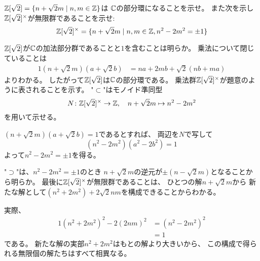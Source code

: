 \documentclass[report]{jlreq}
\begin{document}
\begin{problem}[代数学II 1.18]
    $\mathbb{Z}[\sqrt{2}] = \{ n + \sqrt{2}m \mid n, m \in \mathbb{Z} \}$は
    $\mathbb{C}$の部分環になることを示せ。
    また次を示し$\mathbb{Z}[\sqrt{2}]^\times$が無限群であることを示せ:
    \begin{equation}
        \mathbb{Z}[\sqrt{2}]^\times
            = \{ n + \sqrt{2}m \mid n, m \in \mathbb{Z}, n^2 - 2m^2 = \pm 1 \}
    \end{equation}
\end{problem}

\begin{answer}
    $\mathbb{Z}[\sqrt{2}]$が$\mathbb{C}$の加法部分群であることと$1$を含むことは明らか。
    乗法について閉じていることは
    \begin{alignat}{1}
        (n + \sqrt{2} m) (a + \sqrt{2} b)
            &= na + 2mb + \sqrt{2} (nb + ma)
    \end{alignat}
    よりわかる。
    したがって$\mathbb{Z}[\sqrt{2}]$は$\mathbb{C}$の部分環である。
    乗法群$\mathbb{Z}[\sqrt{2}]^\times$が題意のように表されることを示す。
    "$\subset$"はモノイド準同型
    \begin{equation}
        N \colon \mathbb{Z}[\sqrt{2}]^\times \to \mathbb{Z},
        \quad n + \sqrt{2} m \mapsto n^2 - 2m^2
    \end{equation}
    を用いて示せる。
    \begin{innerproof}
        $(n + \sqrt{2} m) (a + \sqrt{2} b) = 1$であるとすれば、
        両辺を$N$で写して
        \begin{equation}
            (n^2 - 2m^2) (a^2 - 2b^2) = 1
        \end{equation}
        よって$n^2 - 2m^2 = \pm 1$を得る。
    \end{innerproof}
    "$\supset$"は、$n^2 - 2m^2 = \pm 1$のとき
    $n + \sqrt{2} m$の逆元が$\pm (n - \sqrt{2} m)$となることから明らか。
    最後に$\mathbb{Z}[\sqrt{2}]^\times$が無限群であることは、
    ひとつの解$n + \sqrt{2} m$から
    新たな解として$(n^2 + 2m^2) + 2 \sqrt{2} nm$を構成できることからわかる。
    \begin{innerproof}
        実際、
        \begin{alignat}{1}
            (n^2 + 2m^2)^2 - 2 (2nm)^2
                &= (n^2 - 2m^2)^2 \\
                &= 1
        \end{alignat}
        である。
        新たな解の実部$n^2 + 2m^2$はもとの解より大きいから、
        この構成で得られる無限個の解たちはすべて相異なる。
    \end{innerproof}
\end{answer}
\end{document}
